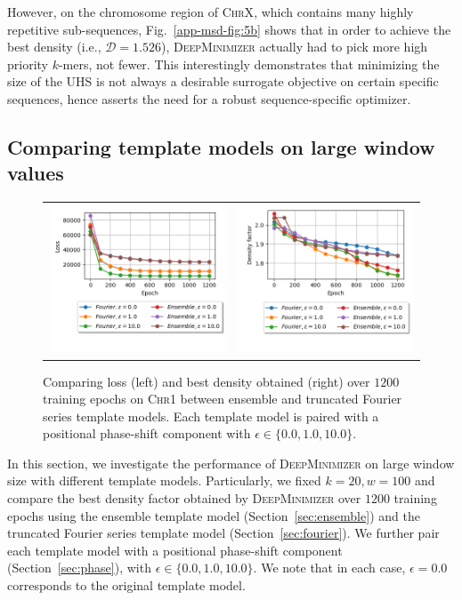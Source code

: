 \noindent However, on the chromosome region of \textsc{ChrX}, which contains many highly repetitive sub-sequences, Fig.~\ref{app-msd-fig:5b} shows that in order to achieve the best density (i.e., $\mathcal{D}=1.526$), \textsc{DeepMinimizer} actually had to pick more high priority $k$-mers, not fewer. This interestingly demonstrates that minimizing the size of the UHS is not always a desirable surrogate objective on certain specific sequences, hence asserts the need for a robust sequence-specific optimizer. 

\subsection{Comparing template models on large window values}
\label{sec:compare_template}
\begin{figure}[h]
\centering
\begin{tabular}{cc}
\includegraphics[width=0.46\columnwidth]{minimizer_plots/compare_template_loss.png} &
\includegraphics[width=0.46\columnwidth]{minimizer_plots/compare_template.png} 
\end{tabular}
\caption{Comparing loss (left) and best density obtained (right) over $1200$ training epochs on \textsc{Chr1} between ensemble and truncated Fourier series template models. Each template model is paired with a positional phase-shift component with $\epsilon\in\{0.0, 1.0, 10.0\}$.}
\label{app-msd-fig:6}
\end{figure}

\noindent In this section, we investigate the performance of \textsc{DeepMinimizer} on large window size with different template models. Particularly, we fixed $k=20, w=100$ and compare the best density factor obtained by \textsc{DeepMinimizer} over $1200$ training epochs  using the ensemble template model (Section~\ref{sec:ensemble}) and the truncated Fourier series template model (Section~\ref{sec:fourier}). We further pair each template model with a positional phase-shift component (Section~\ref{sec:phase}), with $\epsilon \in \{0.0, 1.0, 10.0\}$. We note that in each case, $\epsilon=0.0$ corresponds to the original template model. 

